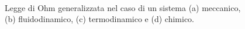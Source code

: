 \begin{figure}[htb]
	\centering
	\qquad
	\\
	\qquad
	\caption{Legge di Ohm generalizzata nel caso di un sistema (a) meccanico, (b) fluidodinamico, (c) termodinamico e (d) chimico.}\label{generalized}		
\end{figure}

